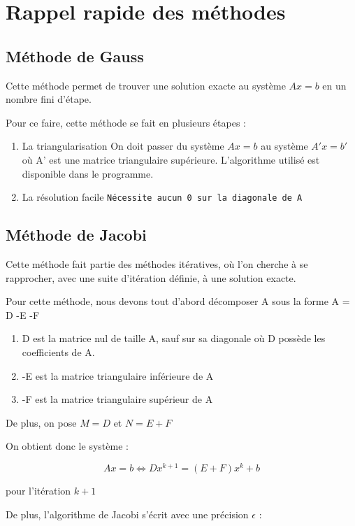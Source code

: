 \documentclass[letter]{article}
\begin{document}
\section{Rappel rapide des méthodes}
\label{sec:orgc9755a6}
\subsection{Méthode de Gauss}
\label{sec:org51ce206}
Cette méthode permet de trouver une solution exacte au système \(Ax = b\) en un nombre fini d'étape.


Pour ce faire, cette méthode se fait en plusieurs étapes :

\begin{enumerate}
\item La triangularisation
On doit passer du système \(Ax=b\) au système \(A'x=b'\) où A' est une matrice triangulaire supérieure. L'algorithme utilisé est disponible dans le programme.
\item La résolution facile
\texttt{Nécessite aucun 0 sur la diagonale de A}
\end{enumerate}

\subsection{Méthode de Jacobi}
\label{sec:org8c63b37}

Cette méthode fait partie des méthodes itératives, où l'on cherche à se rapprocher, avec une suite d'itération définie, à une solution exacte.

Pour cette méthode, nous devons tout d'abord décomposer A sous la forme A = D -E -F

\begin{enumerate}
\item D est la matrice nul de taille A, sauf sur sa diagonale où D possède les coefficients de A.
\item -E est la matrice triangulaire inférieure de A
\item -F est la matrice triangulaire supérieur de A
\end{enumerate}



De plus, on pose \(M = D\) et \(N = E + F\)

On obtient donc le système : 

\[Ax = b \Longleftrightarrow Dx^{k+1} = (E + F)x^k + b \]

pour l'itération \(k+1\)

De plus, l'algorithme de Jacobi s'écrit avec une précision \(\epsilon\) : 
\end{document}
